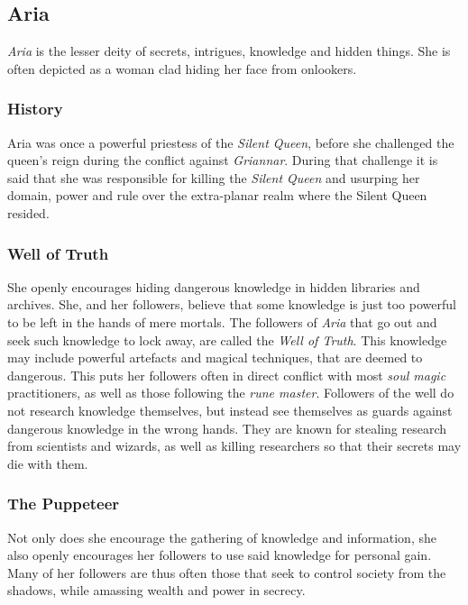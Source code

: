 \subsection{Aria}


\emph{Aria} is the lesser deity of secrets, intrigues, knowledge and hidden
things. She is often depicted as a woman clad hiding her face from onlookers.

\subsubsection*{History}

Aria was once a powerful priestess of the \emph{Silent Queen}, before she
challenged the queen's reign during the conflict against \emph{Griannar}.
During that challenge it is said that she was responsible for killing the
\emph{Silent Queen} and usurping her domain, power and rule over the
extra-planar realm where the Silent Queen resided.

\subsubsection*{Well of Truth}

She openly encourages hiding dangerous knowledge in hidden libraries and
archives. She, and her followers, believe that some knowledge is just too
powerful to be left in the hands of mere mortals. The followers of \emph{Aria}
that go out and seek such knowledge to lock away, are called the \emph{Well of
  Truth}. This knowledge may include powerful artefacts and magical
techniques, that are deemed to dangerous. This puts her followers often in
direct conflict with most \emph{soul magic} practitioners, as well as those
following the \emph{rune master}. Followers of the well do not research
knowledge themselves, but instead see themselves as guards against dangerous
knowledge in the wrong hands. They are known for stealing research from
scientists and wizards, as well as killing researchers so that their secrets
may die with them.

\subsubsection*{The Puppeteer}

Not only does she encourage the gathering of knowledge and information, she
also openly encourages her followers to use said knowledge for personal gain.
Many of her followers are thus often those that seek to control society from
the shadows, while amassing wealth and power in secrecy.

